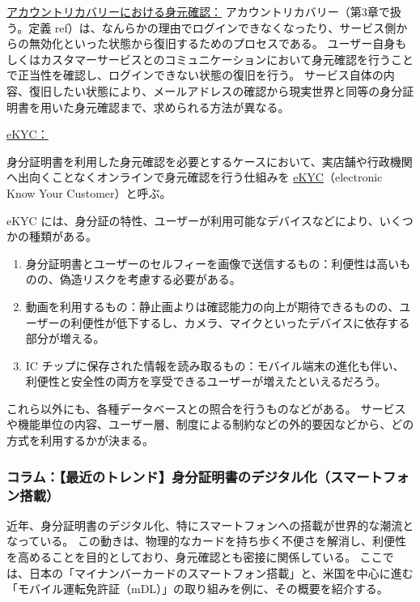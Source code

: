 \documentclass[uplatex]{jsarticle}
\def\ref#1{ref}%
\def\label#1{}%
\begin{document}
\underline{アカウントリカバリーにおける身元確認：}
アカウントリカバリー（第3章で扱う。定義 \ref{dfn:account-recovery}）は、なんらかの理由でログインできなくなったり、サービス側からの無効化といった状態から復旧するためのプロセスである。
ユーザー自身もしくはカスタマーサービスとのコミュニケーションにおいて身元確認を行うことで正当性を確認し、ログインできない状態の復旧を行う。
サービス自体の内容、復旧したい状態により、メールアドレスの確認から現実世界と同等の身分証明書を用いた身元確認まで、求められる方法が異なる。

\underline{eKYC：}

\begin{dfn}[eKYC]\label{dfn:ch2-ekyc}
身分証明書を利用した身元確認を必要とするケースにおいて、実店舗や行政機関へ出向くことなくオンラインで身元確認を行う仕組みを \underline{eKYC}（electronic Know Your Customer）と呼ぶ。
\end{dfn}

eKYC には、身分証の特性、ユーザーが利用可能なデバイスなどにより、いくつかの種類がある。
\begin{enumerate}
\item 身分証明書とユーザーのセルフィーを画像で送信するもの：利便性は高いものの、偽造リスクを考慮する必要がある。
\item 動画を利用するもの：静止画よりは確認能力の向上が期待できるものの、ユーザーの利便性が低下するし、カメラ、マイクといったデバイスに依存する部分が増える。
\item IC チップに保存された情報を読み取るもの：モバイル端末の進化も伴い、利便性と安全性の両方を享受できるユーザーが増えたといえるだろう。
\end{enumerate}
これら以外にも、各種データベースとの照合を行うものなどがある。
サービスや機能単位の内容、ユーザー層、制度による制約などの外的要因などから、どの方式を利用するかが決まる。

\subsubsection{コラム：【最近のトレンド】身分証明書のデジタル化（スマートフォン搭載）}

近年、身分証明書のデジタル化、特にスマートフォンへの搭載が世界的な潮流となっている。
この動きは、物理的なカードを持ち歩く不便さを解消し、利便性を高めることを目的としており、身元確認とも密接に関係している。
ここでは、日本の「マイナンバーカードのスマートフォン搭載」と、米国を中心に進む「モバイル運転免許証（mDL）」の取り組みを例に、その概要を紹介する。
\end{document}
